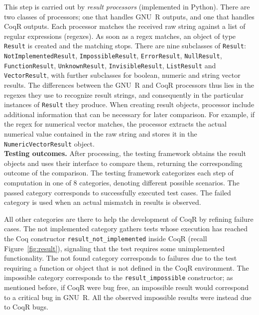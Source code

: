 \documentclass[
    sigplan,
    10pt,
    review, %
    natbib=false %
 ]{acmart}
\newcommand\CoqR{CoqR}
\begin{document}
This step is carried out by {\em result processors} (implemented in Python). There are two classes of processors; one that handles GNU~R outputs, and one that handles CoqR outputs.  Each processor matches the received raw string against a list of regular expressions (regexes). As soon as a regex matches, an object of type \texttt{Result} is created and the matching stops. There are nine subclasses of \texttt{Result}:
 \texttt{NotImplementedResult}, \texttt{ImpossibleResult}, \texttt{ErrorResult}, \texttt{NullResult}, \texttt{FunctionResult}, \texttt{UnknownResult}, \texttt{InvisibleResult},
 \texttt{ListResult} and \texttt{VectorResult}, with further subclasses for boolean, numeric and string vector results.
The differences between the GNU~R and \CoqR{} processors thus lies in the regexes they use to recognize result strings, and consequently in the particular instances of \texttt{Result} they produce.
%
When creating result objects, processor include additional information that can be necessary for later comparison. For example, if the regex for numerical vector matches, the processor extracts the actual numerical value contained in the raw string and stores it in the \texttt{NumericVectorResult} object. \\



\noindent\textbf{Testing outcomes.}
After processing, the testing framework obtains the result objects and uses their interface to compare them, returning the corresponding outcome of the comparison.
The testing framework categorizes each step of computation
in one of 8 categories, denoting different possible scenarios. The \textsf{passed} category corresponds to successfully executed test cases. The \textsf{failed} category is used when an actual mismatch in results is observed. 

All other categories are there to help the development of \CoqR{} by refining failure cases. The \textsf{not implemented} category gathers tests whose execution has reached the Coq constructor \texttt{result_not_implemented} inside \CoqR{} (recall Figure~\ref{fig:result}), signaling that the test requires some unimplemented functionality. The \textsf{not found} category corresponds to failures due to the test requiring a function or object that is not defined in the \CoqR{} environment. The \textsf{impossible} category corresponds to the \texttt{result_impossible} constructor; as mentioned before, if \CoqR{} were bug free, an impossible result would correspond to a critical bug in GNU~R. All the observed \textsf{impossible} results were instead due to \CoqR{} bugs.
\end{document}
